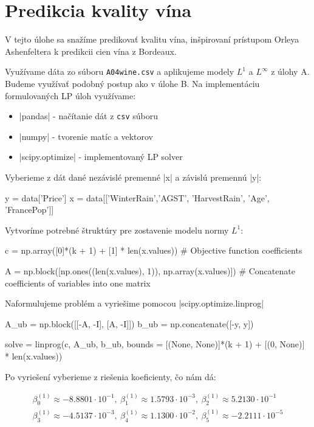 \documentclass[report.tex]{subfiles}
\begin{document}
   

\section{Predikcia kvality vína}\label{sec:C}
V tejto úlohe sa snažíme predikovať kvalitu vína, inšpirovaní prístupom Orleya Ashenfeltera k predikcii cien vína z Bordeaux.

Využívame dáta zo súboru \verb|A04wine.csv| a aplikujeme modely $L^1$ a $L^{\infty}$ z úlohy A. Budeme využívať podobný postup ako v úlohe B. Na implementáciu formulovaných LP úloh využívame:
\begin{itemize}
	\item \pyth|pandas| - načítanie dát z \verb|csv| súboru
	\item \pyth|numpy| - tvorenie matíc a vektorov
	\item \pyth|scipy.optimize| - implementovaný LP solver
\end{itemize}

Vyberieme z dát dané nezávislé premenné \pyth|x| a závislú premennú \pyth|y|:

\begin{python}
y = data['Price']
x = data[['WinterRain','AGST', 'HarvestRain', 'Age', 'FrancePop']]
\end{python}

Vytvoríme potrebné štruktúry pre zostavenie modelu normy $L^1$:

\begin{python}
c = np.array([0]*(k + 1) + [1] * len(x.values)) # Objective function coefficients

A = np.block([np.ones((len(x.values), 1)), np.array(x.values)]) # Concatenate coefficients of variables into one matrix
\end{python}

Naformulujeme problém a vyriešime pomocou \pyth|scipy.optimize.linprog|

\begin{python}
A_ub = np.block([[-A, -I], [A, -I]])
b_ub = np.concatenate([-y, y])

solve = linprog(c, A_ub, b_ub, bounds = [(None, None)]*(k + 1) + [(0, None)] * len(x.values))
\end{python}

Po vyriešení vyberieme z riešenia koeficienty, čo nám dá: 

\begin{gather*}
	\beta_0^{(1)} \approx -8.8801 \cdot 10^{-1} ,~\beta_1^{(1)} \approx 1.5793\cdot 10^{-3},~\beta_2^{(1)} \approx 5.2130\cdot 10^{-1} \\
	\beta_3^{(1)} \approx -4.5137\cdot 10^{-3} ,~\beta_4^{(1)} \approx 1.1300\cdot 10^{-2}  ,~\beta_5^{(1)} \approx -2.2111\cdot 10^{-5}
\end{gather*}
\end{document}
